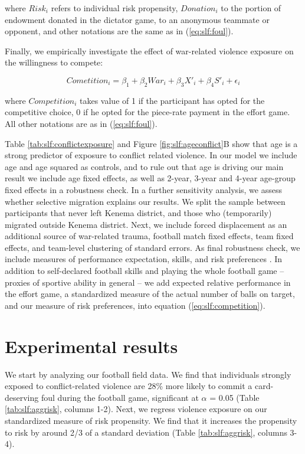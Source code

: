 where $Risk_i$ refers to individual risk propensity, $Donation_i$ to the portion of endowment donated in the dictator game, to an anonymous teammate or opponent, and other notations are the same as in (\ref{eq:slf:foul}).

Finally, we empirically investigate the effect of war-related violence exposure on the willingness to compete:

\begin{equation}
\label{eq:slf:competition}
Cometition_i = \beta_1 + \beta_2 War_i + \beta_3 X'_i + \beta_4 S'_i + \epsilon_i
\end{equation}

where $Competition_i$ takes value of 1 if the participant has opted for the competitive choice, 0 if he opted for the piece-rate payment in the effort game. All other notations are as in (\ref{eq:slf:foul}).

Table \ref{tab:slf:conflictexposure} and Figure \ref{fig:slf:ageconflict}B show that age is a strong predictor of exposure to conflict related violence. In our model we include age and age squared as controls, and to rule out that age is driving our main result we include age fixed effects, as well as 2-year, 3-year and 4-year age-group fixed effects in a robustness check. In a further sensitivity analysis, we assess whether selective migration explains our results. We split the sample between participants that never left Kenema district,  and those who (temporarily) migrated outside Kenema district. Next, we include forced displacement as an additional source of war-related trauma, football match fixed effects, team fixed effects, and team-level clustering of standard errors. As final robustness check, we include measures of performance expectation, skills, and risk preferences \citep{Niederle2007,Bartling2009b}. In addition to self-declared football skills and playing the whole football game – proxies of sportive ability in general – we add expected relative performance in the effort game, a standardized measure of the actual number of balls on target, and our measure of risk preferences, into equation (\ref{eq:slf:competition}). 

\section{Experimental results}
\label{sec:slf:results}
We start by analyzing our football field data. We find that individuals strongly exposed to conflict-related violence are 28\% more likely to commit a card-deserving foul during the football game, significant at $\alpha$ = 0.05 (Table \ref{tab:slf:aggrisk}, columns 1-2).  Next, we regress violence exposure on our standardized measure of risk propensity. We find that it increases the propensity to risk by around 2/3 of a standard deviation (Table \ref{tab:slf:aggrisk}, columns 3-4). 

